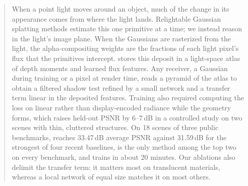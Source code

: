 \begin{abstract}
When a point light moves around an object, much of the change in its appearance comes from where the light lands.
Relightable Gaussian splatting methods estimate this one primitive at a time; we instead reason in the light's image plane.
When the Gaussians are rasterized from the light, the alpha-compositing weights are the fractions of each light pixel's flux that the primitives intercept.
\ours stores this deposit in a light-space atlas of depth moments and learned flux features.
Any receiver, a Gaussian during training or a pixel at render time, reads a pyramid of the atlas to obtain a filtered shadow test refined by a small network and a transfer term linear in the deposited features.
Training also required computing the loss on linear rather than display-encoded radiance while the geometry forms, which raises held-out PSNR by 6--7\,dB in a controlled study on two scenes with thin, cluttered structures.
On 18 scenes of three public benchmarks, \ours reaches 33.47\,dB average PSNR against 31.59\,dB for the strongest of four recent baselines, is the only method among the top two on every benchmark, and trains in about 20 minutes.
Our ablations also delimit the transfer term: it matters most on translucent materials, whereas a local network of equal size matches it on most others.
\end{abstract}
